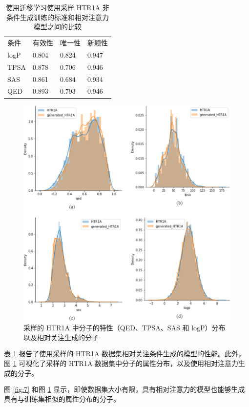 \begin{table}[H]
  \centering
  \caption{使用迁移学习使用采样 HTR1A 非条件生成训练的标准和相对注意力模型之间的比较}
  \label{tab:12}
  \begin{tabular}{llll}
    \hline 条件 & 有效性 & 唯一性 & 新颖性 \\
    logP & 0.804 & 0.824 & 0.947 \\
    TPSA & 0.878 & 0.706 & 0.946 \\
    SAS & 0.861 & 0.684 & 0.934\\
    QED & 0.893 & 0.793 & 0.946 \\
    \hline
    \end{tabular}
\end{table}

\begin{figure}[H]
  \centering
  \includegraphics[width=\linewidth]{figures/8.png}
  \caption{采样的 HTR1A 中分子的特性（QED、TPSA、SAS 和 logP）分布以及相对关注生成的分子}
  \label{fig:8}
\end{figure}

表 \ref{tab:12} 报告了使用采样的 HTR1A 数据集相对关注条件生成的模型的性能。此外，图 \ref{fig:8} 可视化了采样的 HTR1A 数据集中分子的属性分布，以及使用相对注意力生成的分子。


图 \ref{fig:7} 和图 \ref{fig:8} 显示，即使数据集大小有限，具有相对注意力的模型也能够生成具有与训练集相似的属性分布的分子。

